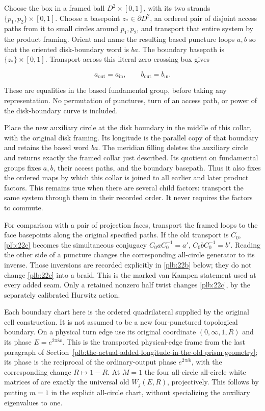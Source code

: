 Choose the box in a framed ball \(D^2\times[0,1]\), with its two strands
\(\{p_1,p_2\}\times[0,1]\). Choose a basepoint \(z_*\in\partial D^2\),
an ordered pair of disjoint access paths from it to small circles around
\(p_1,p_2\), and transport that entire system by the product framing.
Orient and name the resulting based puncture loops \(a,b\) so that
the oriented disk-boundary word is \(ba\). The boundary basepath is
\(\{z_*\}\times[0,1]\). Transport across this literal zero-crossing box gives

\begin{equation}\label{plb:22c}
a_{\mathrm{out}}=a_{\mathrm{in}},\qquad
                        b_{\mathrm{out}}=b_{\mathrm{in}}.
\end{equation}

These are equalities in the based fundamental group, before taking any
representation. No permutation of punctures, turn of an access path,
or power of the disk-boundary curve is included.

Place the new auxiliary circle at the disk boundary in the middle
of this collar, with the original disk framing. Its longitude is
the parallel copy of that boundary and retains the based word \(ba\).
The meridian filling deletes the auxiliary circle and returns exactly
the framed collar just described. Its quotient on fundamental groups
fixes \(a,b\), their access paths, and the boundary basepath. Thus it
also fixes the ordered maps by which this collar is joined to all
earlier and later product factors. This remains true when there are
several child factors: transport the same system through them in
their recorded order. It never requires the factors to commute.

For comparison with a pair of projection faces, transport the framed
loops to the face basepoints along the original specified paths.
If the old transport is \(C_0\), \eqref{plb:22c} becomes the simultaneous
conjugacy \(C_0aC_0^{-1}=a'\), \(C_0bC_0^{-1}=b'\).
Reading the other side of a puncture changes the corresponding
all-circle generator to its inverse. Those inversions are recorded
explicitly in \eqref{plb:22b} below; they do not change \eqref{plb:22c} into a braid.
This is the marked van Kampen statement used at every added seam.
Only a retained nonzero half twist changes \eqref{plb:22c}, by the separately
calibrated Hurwitz action.

Each boundary chart here is the ordered quadrilateral supplied by the
original cell construction. It is not assumed to be a new
four-punctured topological boundary. On a physical turn edge use its
original coordinate \((0,\infty,1,R)\) and its phase \(E=e^{2\pi ix}\).
This is the transported physical-edge frame from the last paragraph
of Section~\ref{plb:the-actual-added-longitude-in-the-old-prism-geometry}; its phase is the reciprocal of the ordinary-output
phase \(e^{2\pi ib}\), with the corresponding change \(R\mapsto1-R\).
At \(M=1\) the four all-circle all-circle white matrices of \cite{Nonparabolic} are exactly the universal old \(W_j(E,R)\), projectively. This follows by putting \(m=1\) in the explicit all-circle chart, without specializing the auxiliary eigenvalues to one.

